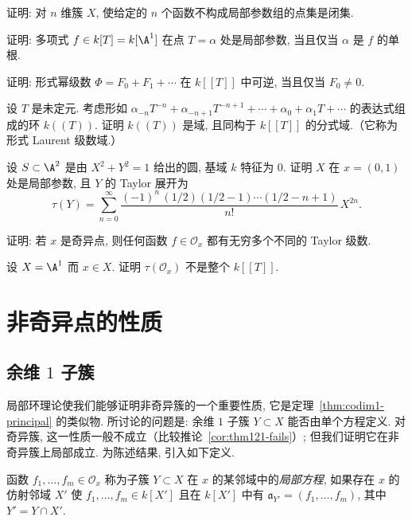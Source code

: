 \begin{compactenum}
	\item 证明: 对 $n$ 维簇 $X$, 使给定的 $n$ 个函数不构成局部参数组的点集是闭集.
	\item 证明: 多项式 $f \in k[T] = k[\A^1]$ 在点 $T = \alpha$ 处是局部参数, 当且仅当 $\alpha$ 是 $f$ 的单根.
	\item 证明: 形式幂级数 $\Phi = F_0 + F_1 + \cdots$ 在 $k[[T]]$ 中可逆, 当且仅当 $F_0 \ne 0$.
	\item 设 $T$ 是未定元. 考虑形如 $\alpha_{-n} T^{-n} + \alpha_{-n+1} T^{-n+1} + \cdots + \alpha_0 + \alpha_1 T + \cdots$ 的表达式组成的环 $k((T))$. 证明 $k((T))$ 是域, 且同构于 $k[[T]]$ 的分式域.（它称为形式 Laurent 级数域.）
	\item 设 $S \subset \A^2$ 是由 $X^2 + Y^2 = 1$ 给出的圆, 基域 $k$ 特征为 $0$. 证明 $X$ 在 $x = (0,1)$ 处是局部参数, 且 $Y$ 的 Taylor 展开为
	\[
		\tau(Y) = \sum_{n=0}^{\infty} \frac{(-1)^n\, (1/2)(1/2 - 1) \cdots (1/2 - n + 1)}{n!}\, X^{2n}.
	\]
	\item 证明: 若 $x$ 是奇异点, 则任何函数 $f \in \mathcal O_x$ 都有无穷多个不同的 Taylor 级数.
	\item 设 $X = \A^1$ 而 $x \in X$. 证明 $\tau(\mathcal O_x)$ 不是整个 $k[[T]]$.
\end{compactenum}

\section{非奇异点的性质}

\subsection{余维 \texorpdfstring{$1$}{1} 子簇}

局部环理论使我们能够证明非奇异簇的一个重要性质, 它是定理~\ref{thm:codim1-principal} 的类似物. 所讨论的问题是: 余维 $1$ 子簇 $Y \subset X$ 能否由单个方程定义. 对奇异簇, 这一性质一般不成立（比较推论~\ref{cor:thm121-fails}）; 但我们证明它在非奇异簇上局部成立. 为陈述结果, 引入如下定义.

\begin{definition}[局部方程]\label{def:local-equations}
	函数 $f_1, \ldots, f_m \in \mathcal O_x$ 称为子簇 $Y \subset X$ 在 $x$ 的某邻域中的\emph{局部方程}, 如果存在 $x$ 的仿射邻域 $X'$ 使 $f_1, \ldots, f_m \in k[X']$ 且在 $k[X']$ 中有 $\mathfrak a_{Y'} = (f_1, \ldots, f_m)$, 其中 $Y' = Y \cap X'$.
\end{definition}

